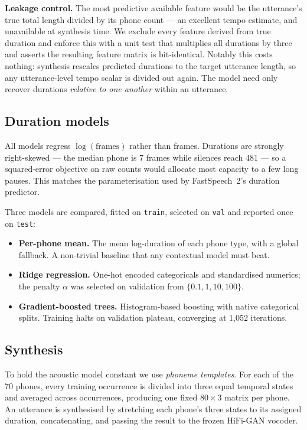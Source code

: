 \documentclass[conference]{IEEEtran}
\begin{document}
\textbf{Leakage control.} The most predictive available feature would be the utterance's true
total length divided by its phone count --- an excellent tempo estimate, and unavailable at
synthesis time. We exclude every feature derived from true duration and enforce this with a unit
test that multiplies all durations by three and asserts the resulting feature matrix is
bit-identical. Notably this costs nothing: synthesis rescales predicted durations to the target
utterance length, so any utterance-level tempo scalar is divided out again. The model need only
recover durations \emph{relative to one another} within an utterance.

\subsection{Duration models}
All models regress $\log(\textrm{frames})$ rather than frames. Durations are strongly right-skewed
--- the median phone is 7 frames while silences reach 481 --- so a squared-error objective on raw
counts would allocate most capacity to a few long pauses. This matches the parameterisation used
by FastSpeech~2's duration predictor.

Three models are compared, fitted on \texttt{train}, selected on \texttt{val} and reported once on
\texttt{test}:

\begin{itemize}
\item \textbf{Per-phone mean.} The mean log-duration of each phone type, with a global fallback.
      A non-trivial baseline that any contextual model must beat.
\item \textbf{Ridge regression.} One-hot encoded categoricals and standardised numerics; the
      penalty $\alpha$ was selected on validation from $\{0.1, 1, 10, 100\}$.
\item \textbf{Gradient-boosted trees.} Histogram-based boosting with native categorical splits.
      Training halts on validation plateau, converging at 1{,}052 iterations.
\end{itemize}

\subsection{Synthesis}
To hold the acoustic model constant we use \emph{phoneme templates}. For each of the 70 phones,
every training occurrence is divided into three equal temporal states and averaged across
occurrences, producing one fixed $80 \times 3$ matrix per phone. An utterance is synthesised by
stretching each phone's three states to its assigned duration, concatenating, and passing the
result to the frozen HiFi-GAN vocoder.
\end{document}
